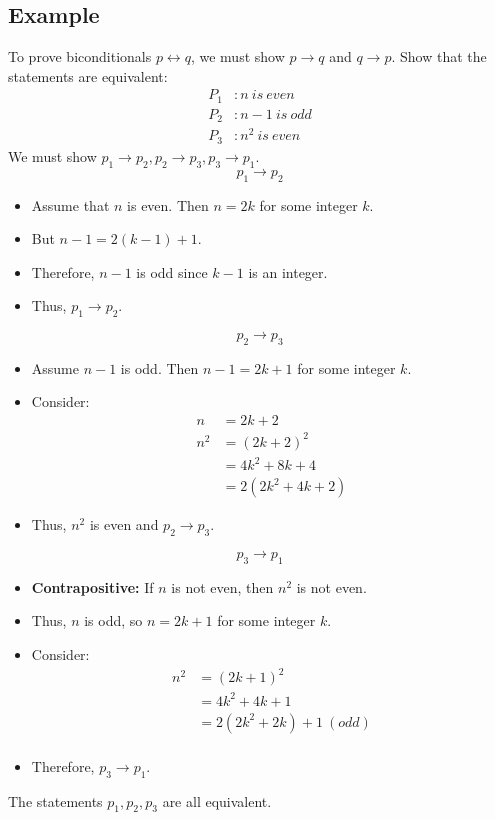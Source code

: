 \documentclass{math}
\begin{document}
\subsection*{Example}
To prove biconditionals \( p \leftrightarrow q \), we must show \( p \to q \)
and \( q \to p \). Show that the statements are equivalent:
\begin{align*}
  P_{1}&: n\ is\ even \\
  P_{2}&: n-1\ is\ odd \\
  P_{3}&: n^{2}\ is\ even
\end{align*}
We must show \( p_{1} \to p_{2}, p_{2} \to p_{3}, p_{3} \to p_{1} \).
\[ p_{1} \to p_{2} \]
\begin{itemize}
  \item Assume that \( n \) is even. Then \( n = 2k \) for some integer \( k \).
  \item But \( n-1 = 2(k-1)+1 \).
  \item Therefore, \( n-1 \) is odd since \( k-1 \) is an integer.
  \item Thus, \( p_{1} \to p_{2} \).
\end{itemize}
\[ p_{2} \to p_{3} \]
\begin{itemize}
  \item Assume \( n-1 \) is odd. Then \( n-1 = 2k+1 \) for some integer \( k \).
  \item Consider:
    \begin{align*}
      n &= 2k+2 \\
      n^{2} &= (2k+2)^{2} \\
      &= 4k^{2}+8k+4 \\
      &= 2(2k^{2}+4k+2)
    \end{align*}
  \item Thus, \( n^{2} \) is even and \( p_{2} \to p_{3} \).
\end{itemize}
\[ p_{3} \to p_{1} \]
\begin{itemize}
  \item \textbf{Contrapositive:} If \( n \) is not even, then \( n^{2} \) is not
    even.
  \item Thus, \( n \) is odd, so \( n = 2k+1 \) for some integer \( k \).
  \item Consider:
    \begin{align*}
      n^{2} &= (2k+1)^{2} \\
      &= 4k^{2}+4k+1 \\
      &= 2(2k^{2}+2k)+1\ (odd) \\
    \end{align*}
  \item Therefore, \( p_{3} \to p_{1} \).
\end{itemize}
The statements \( p_{1}, p_{2}, p_{3} \) are all equivalent.
\end{document}
